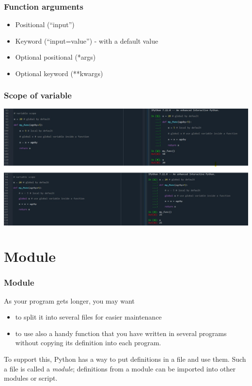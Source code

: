 \documentclass{beamer}
\begin{document}
    \begin{frame}
    \frametitle{Function arguments}
        \begin{itemize}
            \item Positional (“input”) 
            \item Keyword (“input=value”) - with a default value
            \item Optional positional (*args)
            \item Optional keyword (**kwargs)        
        \end{itemize}
    \end{frame}
    
    
    \begin{frame}
    \frametitle{Scope of variable}
        \centering
        \includegraphics[scale=0.5]{figures/variable_scope.jpg}
    \end{frame}
    
\section{Module} 

    \begin{frame}
    \frametitle{Module}
    
    As your program gets longer, you may want
    \begin{itemize}
        \item to split it into several files 
        for easier maintenance
        \item to use also a handy function that
        you have written in several programs without copying its definition into each 
        program.
    \end{itemize}
    
    \vskip 2mm 
    
    To support this, Python has a way to put definitions in a file
    and use them. Such a file is called a \textit{module}; definitions from 
    a module can be imported into other modules or script. 
    
    \end{frame}
    
\end{document}
